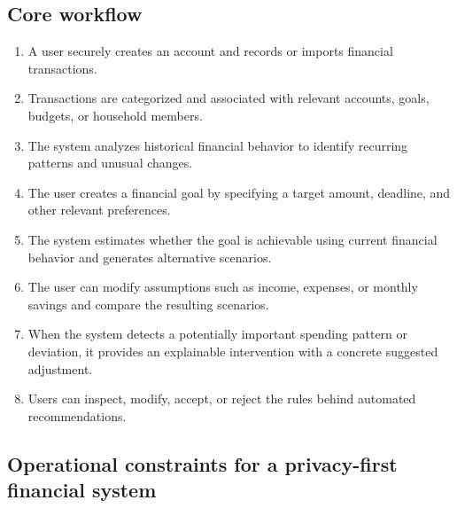 \documentclass[11pt,a4paper]{article}
\begin{document}
\subsection{Core workflow}

\begin{enumerate}[leftmargin=0.7cm]
    \item A user securely creates an account and records or imports financial
    transactions.
    
    \item Transactions are categorized and associated with relevant accounts,
    goals, budgets, or household members.
    
    \item The system analyzes historical financial behavior to identify
    recurring patterns and unusual changes.
    
    \item The user creates a financial goal by specifying a target amount,
    deadline, and other relevant preferences.
    
    \item The system estimates whether the goal is achievable using current
    financial behavior and generates alternative scenarios.
    
    \item The user can modify assumptions such as income, expenses, or monthly
    savings and compare the resulting scenarios.
    
    \item When the system detects a potentially important spending pattern or
    deviation, it provides an explainable intervention with a concrete
    suggested adjustment.
    
    \item Users can inspect, modify, accept, or reject the rules behind
    automated recommendations.
\end{enumerate}


\subsection{Operational constraints for a privacy-first financial system}
\end{document}
